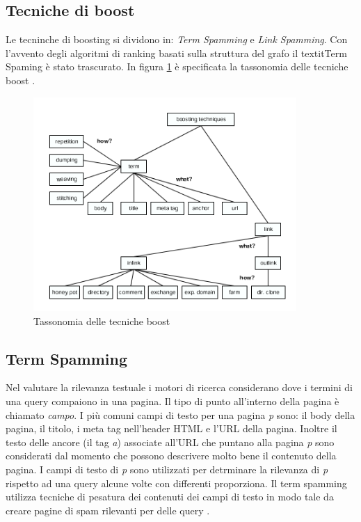 \subsection{Tecniche di boost}
Le tecninche di boosting si dividono in: \textit{Term Spamming} e \textit{Link Spamming}. Con l'avvento degli algoritmi di ranking basati sulla struttura del grafo il textit{Term Spaming} è stato trascurato. In figura \ref{fig:tassonomiaTecnicheBoost} è specificata la tassonomia delle tecniche boost \cite{ilprints646}.
\begin{figure} 
 \centering
 \includegraphics[width=10cm]{immagini/tassonomiaTecnicheBoost}
 \caption{Tassonomia delle tecniche boost}
 \label{fig:tassonomiaTecnicheBoost}
\end{figure}

\subsection{Term Spamming}
Nel valutare la rilevanza testuale i motori di ricerca considerano dove i termini di una query compaiono in una pagina. Il tipo di punto all'interno della pagina è chiamato \textit{campo}. I più comuni campi di testo per una pagina \textit{p} sono: il body della pagina, il titolo, i meta tag nell'header HTML e l'URL della pagina. Inoltre il testo delle ancore (il tag \textit{a}) associate all'URL che puntano alla pagina \textit{p} sono considerati dal momento che possono descrivere molto bene il contenuto della pagina. I campi di testo  di \textit{p} sono utilizzati per detrminare la rilevanza di \textit{p} rispetto ad una query alcune volte con differenti proporziona. Il term spamming utilizza tecniche di pesatura dei contenuti dei campi di testo in modo tale da creare pagine di spam rilevanti per delle query \cite{ilprints646}.

